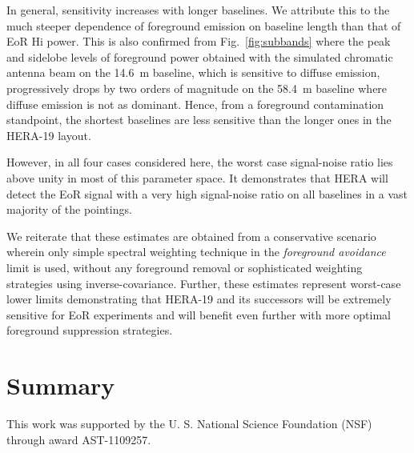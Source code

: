 \documentclass[preprint2,iop,numberedappendix,twocolappendix,appendixfloats]{emulateapj}
\begin{document}
In general, sensitivity increases with longer baselines. We attribute this to the much steeper dependence of foreground emission on baseline length than that of EoR H{\sc i} power. This is also confirmed from Fig.~\ref{fig:subbands} where the peak and sidelobe levels of foreground power obtained with the simulated chromatic antenna beam on the 14.6~m baseline, which is sensitive to diffuse emission, progressively drops by two orders of magnitude on the 58.4~m baseline where diffuse emission is not as dominant. Hence, from a foreground contamination standpoint, the shortest baselines are less sensitive than the longer ones in the HERA-19 layout.

However, in all four cases considered here, the worst case signal-noise ratio lies above unity in most of this parameter space. It demonstrates that HERA will detect the EoR signal with a very high signal-noise ratio on all baselines in a vast majority of the pointings. 

We reiterate that these estimates are obtained from a conservative scenario wherein only simple spectral weighting technique in the {\it foreground avoidance} limit is used, without any foreground removal or sophisticated weighting strategies using inverse-covariance. Further, these estimates represent worst-case lower limits demonstrating that HERA-19 and its successors will be extremely sensitive for EoR experiments and will benefit even further with more optimal foreground suppression strategies.

\section{Summary}\label{sec:summary}

\acknowledgments

This work was supported by the U. S. National Science Foundation (NSF) through award AST-1109257. 




\end{document}
